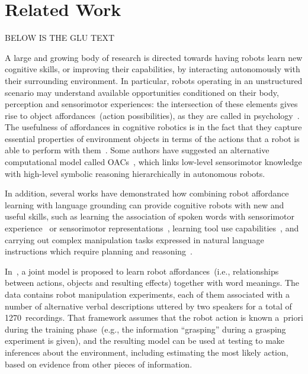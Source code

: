 \section{Related Work}

BELOW IS THE GLU TEXT

A large and growing body of research is directed towards having robots learn new cognitive skills, or improving their capabilities, by interacting autonomously with their surrounding environment. In particular, robots operating in an unstructured scenario may understand available opportunities conditioned on their body, perception and sensorimotor experiences: the intersection of these elements gives rise to object affordances~(action possibilities), as they are called in psychology~\cite{gibson:2014}. The usefulness of affordances in cognitive robotics is in the fact that they capture essential properties of environment objects in terms of the actions that a robot is able to perform with them~\cite{montesano:2008,jamone:2016:tcds}.
Some authors have suggested an alternative computational model called \acp{OAC}~\cite{kruger:2011:ras}, which links low-level sensorimotor knowledge with high-level symbolic reasoning hierarchically in autonomous robots.

In addition, several works have demonstrated how combining robot affordance learning with language grounding can provide cognitive robots with new and useful skills, such as learning the association of spoken words with sensorimotor experience~\cite{salvi:2012:smcb,morse:2016:cogsci} or sensorimotor representations~\cite{stramandinoli:2016:icdl}, learning tool use capabilities~\cite{goncalves:2014:icarsc,goncalves:2014:icdl}, and carrying out complex manipulation tasks expressed in natural language instructions which require planning and reasoning~\cite{antunes:2016:icra}.

In~\cite{salvi:2012:smcb}, a joint model is proposed to learn robot affordances~(i.e., relationships between actions, objects and resulting effects) together with word meanings. The data contains robot manipulation experiments, each of them associated with a number of alternative verbal descriptions uttered by two speakers for a total of 1270~recordings. That framework assumes that the robot action is known a~priori during the training phase~(e.g., the information ``grasping'' during a grasping experiment is given), and the resulting model can be used at testing to make inferences about the environment, including estimating the most likely action, based on evidence from other pieces of information.


